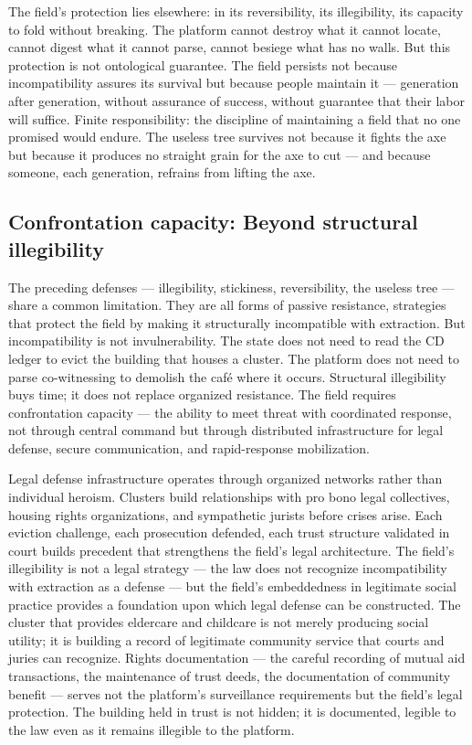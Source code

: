 The field's protection lies elsewhere: in its reversibility, its illegibility, its capacity to fold without breaking. The platform cannot destroy what it cannot locate, cannot digest what it cannot parse, cannot besiege what has no walls. But this protection is not ontological guarantee. The field persists not because incompatibility assures its survival but because people maintain it — generation after generation, without assurance of success, without guarantee that their labor will suffice. Finite responsibility: the discipline of maintaining a field that no one promised would endure. The useless tree survives not because it fights the axe but because it produces no straight grain for the axe to cut — and because someone, each generation, refrains from lifting the axe.

\subsection{Confrontation capacity: Beyond structural illegibility}

The preceding defenses — illegibility, stickiness, reversibility, the useless tree — share a common limitation. They are all forms of passive resistance, strategies that protect the field by making it structurally incompatible with extraction. But incompatibility is not invulnerability. The state does not need to read the CD ledger to evict the building that houses a cluster. The platform does not need to parse co-witnessing to demolish the café where it occurs. Structural illegibility buys time; it does not replace organized resistance. The field requires confrontation capacity — the ability to meet threat with coordinated response, not through central command but through distributed infrastructure for legal defense, secure communication, and rapid-response mobilization.

Legal defense infrastructure operates through organized networks rather than individual heroism. Clusters build relationships with pro bono legal collectives, housing rights organizations, and sympathetic jurists before crises arise. Each eviction challenge, each prosecution defended, each trust structure validated in court builds precedent that strengthens the field's legal architecture. The field's illegibility is not a legal strategy — the law does not recognize incompatibility with extraction as a defense — but the field's embeddedness in legitimate social practice provides a foundation upon which legal defense can be constructed. The cluster that provides eldercare and childcare is not merely producing social utility; it is building a record of legitimate community service that courts and juries can recognize. Rights documentation — the careful recording of mutual aid transactions, the maintenance of trust deeds, the documentation of community benefit — serves not the platform's surveillance requirements but the field's legal protection. The building held in trust is not hidden; it is documented, legible to the law even as it remains illegible to the platform.

